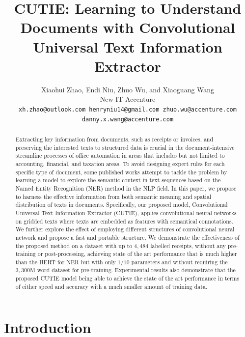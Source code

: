 \documentclass[10pt,twocolumn,letterpaper]{article}
\begin{document}
\title{CUTIE: Learning to Understand Documents with Convolutional Universal Text Information Extractor}

\author{
  Xiaohui Zhao, Endi Niu, Zhuo Wu, and Xiaoguang Wang \\
  New IT Accenture \\
{\tt\small xh.zhao@outlook.com henryniu14@gmail.com zhuo.wu@accenture.com danny.x.wang@accenture.com}
}

\maketitle

\begin{abstract}
   Extracting key information from documents, such as receipts or invoices, and preserving the interested texts to structured data is crucial in the document-intensive streamline processes of office automation in areas that includes but not limited to accounting, financial, and taxation areas. To avoid designing expert rules for each specific type of document, some published works attempt to tackle the problem by learning a model to explore the semantic context in text sequences based on the Named Entity Recognition (NER) method in the NLP field. In this paper, we propose to harness the effective information from both semantic meaning and spatial distribution of texts in documents. Specifically, our proposed model, Convolutional Universal Text Information Extractor (CUTIE), applies convolutional neural networks on gridded texts where texts are embedded as features with semantical connotations. We further explore the effect of employing different structures of convolutional neural network and propose a fast and portable structure. We demonstrate the effectiveness of the proposed method on a dataset with up to $4,484$ labelled receipts, without any pre-training or post-processing, achieving state of the art performance that is much higher than the BERT for NER but with only $1/10$ parameters and without requiring the $3,300$M word dataset for pre-training. Experimental results also demonstrate that the proposed CUTIE model being able to achieve the state of the art performance in terms of either speed and accuracy with a much smaller amount of training data.
\end{abstract}

\section{Introduction}
\end{document}
